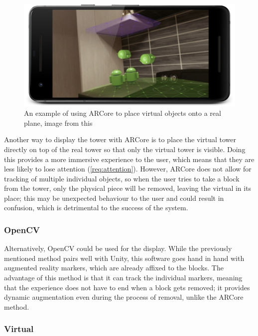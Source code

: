 \begin{figure}[ht]
\begin{minipage}{\textwidth}
    \centering
    \includegraphics[width=.8\textwidth]{images/design/andyandroid}
    \caption{An example of using ARCore to place virtual objects onto a real plane, image from this  \protect{}}
    \label{fig:andyandroid}
\end{minipage}
\end{figure}

Another way to display the tower with ARCore is to place the virtual tower directly on top of the real tower so that only the virtual tower is visible. Doing this provides a more immersive experience to the user, which means that they are less likely to lose attention (\cref{req:attention}). However, ARCore does not allow for tracking of multiple individual objects, so when the user tries to take a block from the tower, only the physical piece will be removed, leaving the virtual in its place; this may be unexpected behaviour to the user and could result in confusion, which is detrimental to the success of the system.

\subsubsection{OpenCV}

Alternatively, OpenCV could be used for the display. While the previously mentioned method pairs well with Unity, this software goes hand in hand with augmented reality markers, which are already affixed to the blocks. The advantage of this method is that it can track the individual markers, meaning that the experience does not have to end when a block gets removed; it provides dynamic augmentation even during the process of removal, unlike the ARCore method.

\subsubsection{Virtual}

